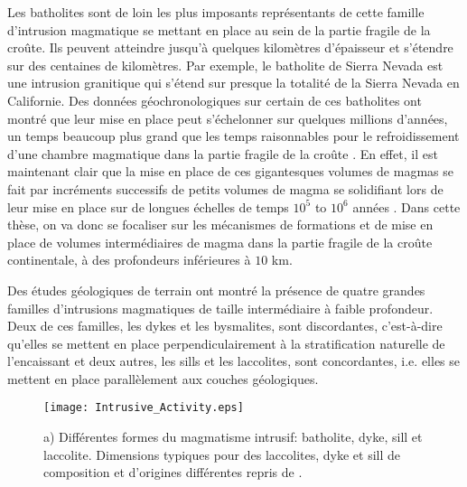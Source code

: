 Les batholites sont de loin  les plus imposants représentants de cette
famille  d'intrusion magmatique  se mettant  en  place au  sein de  la
partie fragile de  la croûte.  Ils peuvent  atteindre jusqu'à quelques
kilomètres d'épaisseur  et s'étendre sur des  centaines de kilomètres.
Par  exemple,  le  batholite  de   Sierra  Nevada  est  une  intrusion
granitique qui s'étend sur presque la  totalité de la Sierra Nevada en
Californie.   Des   données  géochronologiques  sur  certain   de  ces
batholites ont  montré que  leur mise en  place peut  s'échelonner sur
quelques millions d'années, un temps beaucoup plus grand que les temps
raisonnables pour le refroidissement  d'une chambre magmatique dans la
partie fragile de  la croûte \citep{Glazner:2004gv}. En  effet, il est
maintenant clair que  la mise en place de ces  gigantesques volumes de
magmas se fait par incréments successifs de petits volumes de magma se
solidifiant lors  de leur  mise en  place sur  de longues  échelles de
temps $10^5$  to $10^6$  années \citep{Petford:2000cc,Glazner:2004gv}.
Dans  cette thèse,  on  va donc  se focaliser  sur  les mécanismes  de
formations et de mise en place de volumes intermédiaires de magma dans
la  partie  fragile  de  la croûte  continentale,  à  des  profondeurs
inférieures à $10$ km.

Des études  géologiques de  terrain ont montré  la présence  de quatre
grandes familles  d'intrusions magmatiques  de taille  intermédiaire à
faible profondeur.  Deux de ces  familles, les dykes et les bysmalites,
sont   discordantes,  c'est-à-dire   qu'elles   se   mettent  en   place
perpendiculairement à  la stratification naturelle de  l'encaissant et
deux autres, les sills et  les laccolites, sont concordantes, i.e. elles
se mettent en place parallèlement aux couches géologiques.

\begin{figure}[htpb]
  \begin{center}
    \graphicspath{ {/Users/thorey/Documents/These/Manuscript/Figure/Chapter1/} }
    \texttt{[image: Intrusive\_Activity.eps]}
    \caption{a) Différentes formes  du magmatisme intrusif: batholite,
      dyke,  sill   et  laccolite.    Dimensions  typiques   pour  des
      laccolites,   dyke  et   sill  de   composition  et   d'origines
      différentes repris de \citet{Cruden:tg}. }
    \label{Dimension}
  \end{center}
\end{figure}

